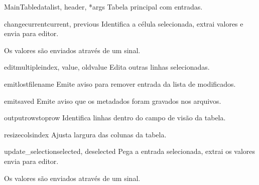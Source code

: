 \documentclass[letterpaper,10pt,portuguese]{manual}
\begin{document}
\hypertarget{veliger.MainTable}{}\begin{classdesc}{MainTable}{datalist, header, *args}
Tabela principal com entradas.

\hypertarget{veliger.MainTable.changecurrent}{}\begin{methoddesc}{changecurrent}{current, previous}
Identifica a célula selecionada, extrai valores e envia para editor.

Os valores são enviados através de um sinal.
\end{methoddesc}

\hypertarget{veliger.MainTable.editmultiple}{}\begin{methoddesc}{editmultiple}{index, value, oldvalue}
Edita outras linhas selecionadas.
\end{methoddesc}

\hypertarget{veliger.MainTable.emitlost}{}\begin{methoddesc}{emitlost}{filename}
Emite aviso para remover entrada da lista de modificados.
\end{methoddesc}

\hypertarget{veliger.MainTable.emitsaved}{}\begin{methoddesc}{emitsaved}{}
Emite aviso que os metadados foram gravados nos arquivos.
\end{methoddesc}

\hypertarget{veliger.MainTable.outputrows}{}\begin{methoddesc}{outputrows}{toprow}
Identifica linhas dentro do campo de visão da tabela.
\end{methoddesc}

\hypertarget{veliger.MainTable.resizecols}{}\begin{methoddesc}{resizecols}{index}
Ajusta largura das colunas da tabela.
\end{methoddesc}

\hypertarget{veliger.MainTable.update\_selection}{}\begin{methoddesc}{update\_selection}{selected, deselected}
Pega a entrada selecionada, extrai os valores envia para editor.

Os valores são enviados através de um sinal.
\end{methoddesc}
\end{classdesc}
\end{document}

